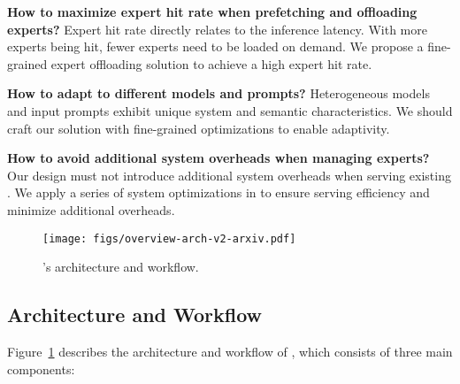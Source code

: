 \textbf{How to maximize expert hit rate when prefetching and offloading experts?} 
% 
Expert hit rate directly relates to the inference latency. With more experts being hit, fewer experts need to be loaded on demand. 
We propose a fine-grained expert offloading solution to achieve a high expert hit rate.



\textbf{How to adapt to different \MoE models and prompts?}
Heterogeneous \MoE models and input prompts exhibit unique system and semantic characteristics.
We should craft our solution with fine-grained optimizations to enable adaptivity.


\textbf{How to avoid additional system overheads when managing experts?}
Our design must not introduce additional system overheads when serving existing \MoE \LLMs.
We apply a series of system optimizations in \sys to ensure serving efficiency and minimize additional overheads.



\begin{figure}[t]
  \centering
  \texttt{[image: figs/overview-arch-v2-arxiv.pdf]}
  \vspace{-0.1in}
  \caption{\sys's architecture and workflow.} 
  \vspace{-0.1in}
  \label{fig:overview-arch.pdf}
\end{figure}

\subsection{Architecture and Workflow}

Figure~\ref{fig:overview-arch.pdf} describes the architecture and workflow of \sys, which consists of three main components: 

